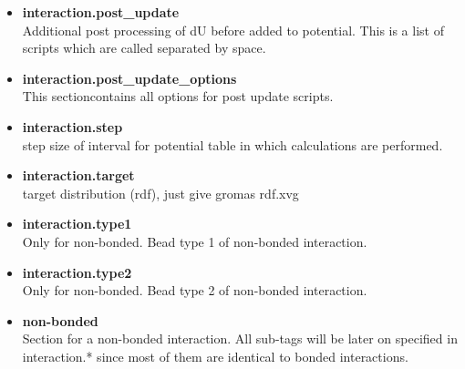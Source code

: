 \begin{itemize}
\item \textbf{interaction.post\_update} \\
Additional post processing of dU before added to potential. This is a list of scripts which are called separated by space.
\item \textbf{interaction.post\_update\_options} \\
This sectioncontains all options for post update scripts.
\item \textbf{interaction.step} \\
step size of interval for potential table in which calculations are performed.
\item \textbf{interaction.target} \\
 target distribution (rdf), just give gromas rdf.xvg 
\item \textbf{interaction.type1} \\
Only for non-bonded. Bead type 1 of non-bonded interaction.
\item \textbf{interaction.type2} \\
Only for non-bonded. Bead type 2 of non-bonded interaction.
\item \textbf{non-bonded} \\
      Section for a non-bonded interaction. All sub-tags will be later on specified in 
      interaction.* since most of them are identical to bonded interactions.
\end{itemize}
